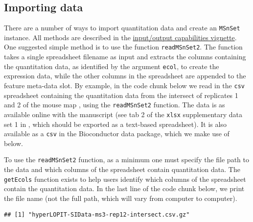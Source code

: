 \subsection*{Importing data}

There are a number of ways to import quantitation data and create an
\texttt{MSnSet} instance. All methods are described in the
\href{http://bioconductor.org/packages/release/bioc/vignettes/MSnbase/inst/doc/MSnbase-io.pdf}{input/output
  capabilities vignette}. One suggested simple method is to use the
function \texttt{readMSnSet2}. The function takes a single spreadsheet
filename as input and extracts the columns containing the quantitation
data, as identified by the argument \texttt{ecol}, to create the
expression data, while the other columns in the spreadsheet are
appended to the feature meta-data slot.  By example, in the code chunk
below we read in the \texttt{csv} spreadsheet containing the
quantitation data from the intersect of replicates 1 and 2 of the
mouse map \cite{hyper}, using the \texttt{readMSnSet2} function. The
data is as available online with the manuscript (see tab 2 of the
\texttt{xlsx} supplementary data set 1 in \cite{hyper}, which should
be exported as a text-based spreadsheet). It is also available as a
\texttt{csv} in the Bioconductor  data
package, which we make use of below.

To use the \texttt{readMSnSet2} function, as a minimum one must specify the
file path to the data and which columns of the spreadsheet contain
quantitation data. The \texttt{getEcols} function exists to help users
identify which columns of the spreadsheet contain the
quantitation data. In the last line of the code chunk below, we print
the file name (not the full path, which will vary from computer to
computer). 


\begin{knitrout}
\color{fgcolor}\begin{kframe}
\begin{alltt}
\hlstd{(}\hlstd{)}
 \hlkwb{<-} \hlstd{(}\hlstd{,}  \hlstd{=} \hlstd{)}
 \hlkwb{<-}   \hlstd{=} \hlstd{,}
           \hlstd{=} \hlstd{)}
\end{alltt}
\begin{verbatim}
## [1] "hyperLOPIT-SIData-ms3-rep12-intersect.csv.gz"
\end{verbatim}
\end{kframe}
\end{knitrout}

